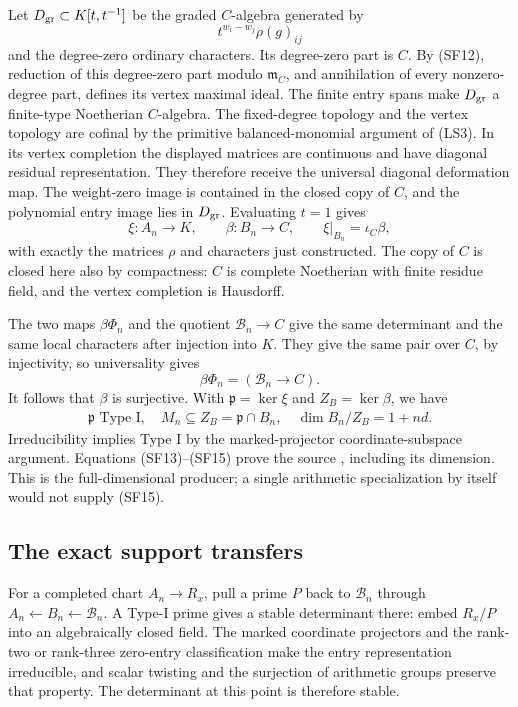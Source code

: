 Let \(D_{\rm gr}\subset K[t,t^{-1}]\) be the graded
\(C\)-algebra generated by
\[
                      t^{w_i-w_j}\rho(g)_{ij}
\]
and the degree-zero ordinary characters.
Its degree-zero part is \(C\).
By (SF12), reduction of this degree-zero part
modulo \(\mathfrak m_C\), and annihilation of every
nonzero-degree part, defines its vertex maximal ideal.
The finite entry spans make \(D_{\rm gr}\) a finite-type
Noetherian \(C\)-algebra.
The fixed-degree topology and the vertex topology
are cofinal by the primitive balanced-monomial
argument of (LS3).
In its vertex completion the displayed matrices
are continuous and have diagonal residual representation.
They therefore receive the universal diagonal
deformation map.
The weight-zero image is contained in the closed
copy of \(C\), and the polynomial entry image lies
in \(D_{\rm gr}\).
Evaluating \(t=1\) gives
\[
             \xi:A_n\longrightarrow K,\qquad
             \beta:B_n\longrightarrow C,\qquad
             \xi|_{B_n}=\iota_C\beta,                       \tag{SF13}
\]
with exactly the matrices \(\rho\) and characters
just constructed.
The copy of \(C\) is closed here also by compactness:
\(C\) is complete Noetherian with finite residue
field, and the vertex completion is Hausdorff.

The two maps \(\beta\Phi_n\) and the quotient
\(\mathcal B_n\to C\) give the same determinant
and the same local characters after injection into
\(K\). They give the same pair over \(C\), by
injectivity, so universality gives
\[
                   \beta\Phi_n=(\mathcal B_n\to C).         \tag{SF14}
\]
It follows that \(\beta\) is surjective.
With \(\mathfrak p=\ker\xi\) and \(Z_B=\ker\beta\),
we have
\[
 \begin{gathered}
 \mathfrak p\text{ Type I},\quad
 M_n\subseteq Z_B=\mathfrak p\cap B_n,\quad
 \dim B_n/Z_B=1+nd .                                       \tag{SF15}
 \end{gathered}
\]
Irreducibility implies Type I by the marked-projector
coordinate-subspace argument.
Equations (SF13)--(SF15) prove the source
, including its dimension.
This is the full-dimensional 
producer; a single arithmetic specialization by
itself would not supply (SF15).

\subsection{The exact support transfers}
For a completed chart \(A_n\to R_x\), pull a prime
\(P\) back to \(\mathcal B_n\) through
\(A_n\leftarrow B_n\leftarrow\mathcal B_n\).
A Type-I prime gives a stable determinant there:
embed \(R_x/P\) into an algebraically closed field.
The marked coordinate projectors and the rank-two
or rank-three zero-entry classification make the
entry representation irreducible, and scalar twisting
and the surjection of arithmetic groups preserve
that property. The determinant at this point is
therefore stable.

